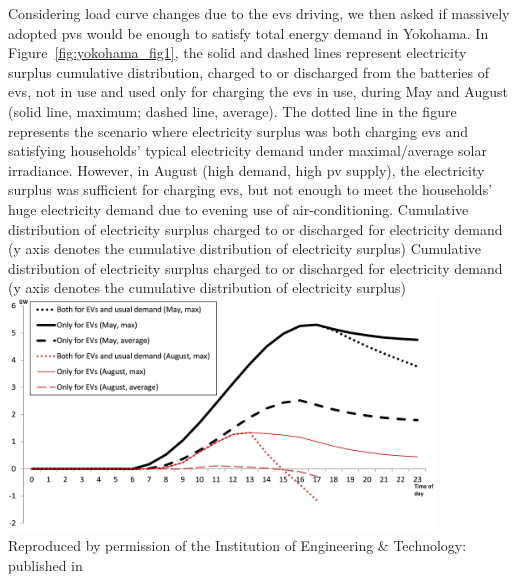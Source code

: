 Considering load curve changes due to the \glspl{ev} driving, we then asked if massively adopted \glspl{pv} would be enough to satisfy total energy demand in Yokohama. In Figure~\ref{fig:yokohama_fig1}, the solid and dashed lines represent electricity surplus cumulative distribution, charged to or discharged from the batteries of \glspl{ev}, not in use and used only for charging the \glspl{ev} in use, during May and August (solid line, maximum; dashed line, average). The dotted line in the figure represents the scenario where electricity surplus was both charging \glspl{ev} and satisfying households' typical electricity demand under maximal/average solar irradiance. However, in August (high demand, high \gls{pv} supply), the electricity surplus was sufficient for charging \glspl{ev}, but not enough to meet the households' huge electricity demand due to evening use of air-conditioning. 
%
\createfigure%
{Cumulative distribution of electricity surplus charged to or discharged for electricity demand (y axis denotes the cumulative distribution of electricity surplus)}%
{Cumulative distribution of electricity surplus charged to or discharged for electricity demand (y axis denotes the cumulative distribution of electricity surplus)}%
{\label{fig:yokohama_fig1}}%
{\includegraphics[width=0.85\textwidth, angle=0]{./scenarios/figures/yokohama_fig1.png}}%
{Reproduced by permission of the Institution of Engineering \& Technology: published in \citet[][Figure~6]{YamagataSeya_ITSIET_2015}}

